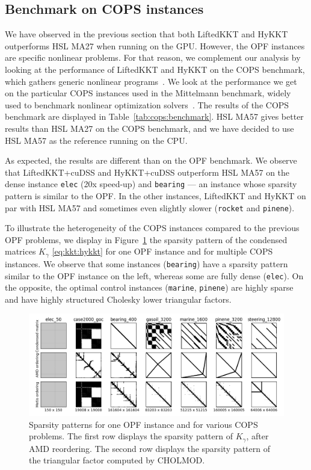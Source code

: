 \subsection{Benchmark on COPS instances}
\label{sec:num:cops}
We have observed in the previous section that both LiftedKKT
and HyKKT outperforms HSL MA27 when running on the GPU.
However, the OPF instances are specific nonlinear problems.
For that reason, we complement our analysis by looking
at the performance of LiftedKKT and HyKKT on the COPS benchmark,
which gathers generic nonlinear programs~\cite{dolan2004benchmarking}.
We look at the performance we get on the particular COPS instances used in
the Mittelmann benchmark, widely used to benchmark nonlinear optimization
solvers~\cite{mittelmann2002benchmark}.
The results of the COPS benchmark are displayed in Table~\ref{tab:cops:benchmark}.
HSL MA57 gives better results than HSL MA27 on the COPS benchmark, and we have
decided to use HSL MA57 as the reference running on the CPU.

As expected, the results are different than on the OPF benchmark.
We observe that LiftedKKT+cuDSS and HyKKT+cuDSS outperform HSL MA57 on the dense instance {\tt elec}
(20x speed-up) and {\tt bearing}  --- an instance whose sparsity pattern
is similar to the OPF. In the other instances, LiftedKKT and HyKKT
on par with HSL MA57 and sometimes even slightly slower ({\tt rocket} and {\tt pinene}).

To illustrate the heterogeneity of the COPS instances compared to the
previous OPF problems, we display in Figure~\ref{fig:cops:nnz} the sparsity pattern of the
condensed matrices $K_\gamma$ \eqref{eq:kkt:hykkt} for one OPF instance and for multiple
COPS instances. We observe that some instances ({\tt bearing}) have a sparsity pattern
similar to the OPF instance on the left, whereas some are fully dense ({\tt elec}).
On the opposite, the optimal control instances ({\tt marine}, {\tt pinene}) are
highly sparse and have highly structured Cholesky lower triangular factors.

\begin{figure}[!ht]
  \centering
  \includegraphics[width=.9\textwidth]{../figures/sparsity_pattern.png}
  \caption{Sparsity patterns for one OPF instance and for various
    COPS problems. The first row displays the sparsity pattern
    of $K_\gamma$, after AMD reordering. The second row displays
    the sparsity pattern of the triangular factor computed by CHOLMOD.
    \label{fig:cops:nnz}
  }
\end{figure}

